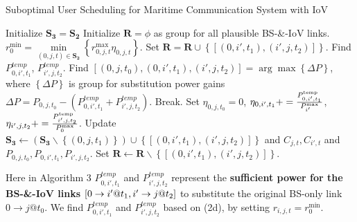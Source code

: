 \documentclass[conference]{IEEEtran}
\begin{document}
\begin{algorithm}[!h]
\caption{Suboptimal User Scheduling for Maritime Communication System with IoV}
\label{alg:1}
\begin{algorithmic}[1]
\STATE Initialize ${{\mathbf{S}}_{\mathbf{3}}}={{\mathbf{S}}_{\mathbf{2}}}$
  \STATE Initialize ${\mathbf{R}} = \phi $ as group for all plausible BS-\&-IoV links.
  \STATE $r_0^{\min } = \mathop {\min }\limits_{\left( {0,j,t} \right) \in {{\mathbf{S}}_{\mathbf{2}}}} \left\{ {r_{0,j,t}^{\max }{\eta _{0,j,t}}} \right\}$.
            \STATE Set ${\mathbf{R = R}} \cup \left\{ {\left[ {\left( {0,i',{t_1}} \right),\left( {i',j,{t_2}} \right)} \right]} \right\}$.
          \ENDIF
        \ENDFOR
      \ENDIF
    \ENDFOR
  \ENDFOR
    \STATE Find ${P_{0,i',{t_1}}^{temp}}$, ${P_{i',j,{t_2}}^{temp}}$. 
    \STATE Find $\left[ {\left( {0,j,{t_0}} \right),\left( {0,i',{t_1}} \right),\left( {i',j,{t_2}} \right)} \right] = \arg \max \left\{ {\Delta P} \right\}$, where ${\left\{ {\Delta P} \right\}}$ is group for substitution power gains $\Delta P = {P_{0,j,{t_0}}} - \left( {{P_{0,i',{t_1}}^{temp}} + {P_{i',j,{t_2}}^{temp}}} \right)$. 
      \STATE Break.
    \ENDIF
    \STATE Set ${\eta _{0,j,{t_0}} = 0}$, ${\eta _{0,i',{t_1}}} += \frac{{{P_{0,i',{t_1}}^{{\rm{temp}}}}}}{{P_{i'}^{\max }}}$, ${\eta _{i',j,{t_2}}} += \frac{{{P_{i',j,{t_2}}^{{\rm{temp}}}}}}{{P_{0}^{\max }}}$.
    \STATE Update ${{\mathbf{S}}_{\mathbf{3}}} \leftarrow \left( {{{\mathbf{S}}_{\mathbf{3}}}\backslash \left\{ {\left( {0,j,{t_1}} \right)} \right\}} \right) \cup \left\{ {\left[ {\left( {0,i',{t_1}} \right),\left( {i',j,{t_2}} \right)} \right]} \right\}$ and ${C_{j,t}},{C_{i',t}}$ and ${P_{0,j,{t_0}}},{P_{0,i',{t_1}}},{P_{i',j,{t_2}}}$.
    \STATE Set $\mathbf{R} \leftarrow \mathbf{R}\backslash \left\{ {\left[ {\left( {0,i',{t_1}} \right),\left( {i',j,{t_2}} \right)} \right]} \right\}$.
  \ENDWHILE
\ENDFOR
\end{algorithmic}
\end{algorithm}
Here in Algorithm 3 ${P_{0,i',{t_1}}^{temp}}$ and ${P_{i',j,{t_2}}^{temp}}$ represent the \textbf{sufficient power for the  BS-\&-IoV links} $\left[ {{\rm{0}} \to i'@{t_1},i' \to j@{t_2}} \right]$ to substitute the original BS-only link $0 \to j @{t_0}$. We find ${P_{0,i',{t_1}}^{temp}}$ and ${P_{i',j,{t_2}}^{temp}}$ based on (2d), by setting ${r_{i,j,t}} = r_0^{\min }$.
\end{document}
